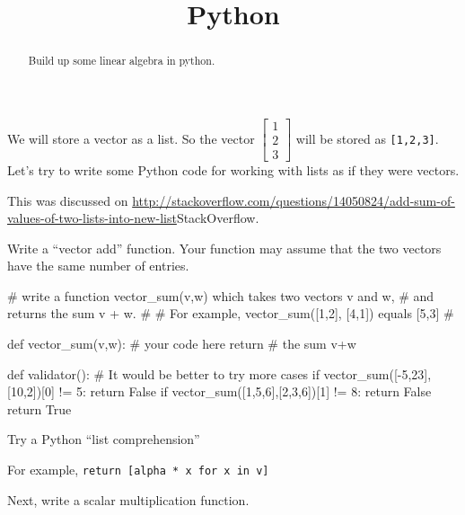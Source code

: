 \documentclass{ximera}
\title{Python}
\begin{document}
\begin{abstract}
  Build up some linear algebra in python.
\end{abstract}
\maketitle

\begin{exercise}
  We will store a vector as a list.  So the vector $\begin{bmatrix} 1 \\
    2 \\ 3\end{bmatrix}$ will be stored as \verb|[1,2,3]|.  Let's try
  to write some Python code for working with lists as if they were
  vectors.

\begin{solution}
  \begin{hint}
    This was discussed on \url{http://stackoverflow.com/questions/14050824/add-sum-of-values-of-two-lists-into-new-list}{StackOverflow}.
  \end{hint}

  Write a ``vector add'' function.  Your function may assume that the
  two vectors have the same number of entries.

\begin{python}
# write a function vector_sum(v,w) which takes two vectors v and w,
# and returns the sum v + w.
#
# For example, vector_sum([1,2], [4,1]) equals [5,3]
#
		
def vector_sum(v,w):
  # your code here
  return # the sum v+w

def validator():
  # It would be better to try more cases
  if vector_sum([-5,23],[10,2])[0] != 5:
    return False
  if vector_sum([1,5,6],[2,3,6])[1] != 8:
    return False
  return True

\end{python}
\end{solution}


\begin{solution}
  \begin{hint}
    Try a Python ``list comprehension''
  \end{hint}

  \begin{hint}
    For example, \verb|return [alpha * x for x in v]|
  \end{hint}

Next, write a scalar multiplication function.


\end{solution}
\end{exercise}
\end{document}
